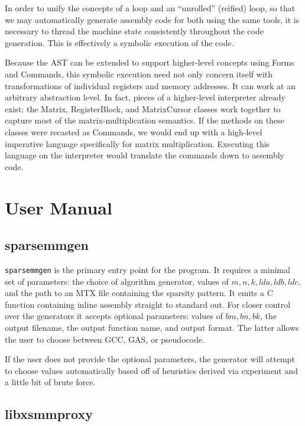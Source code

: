 In order to unify the concepts of a loop and an ``unrolled'' (reified) loop, so that we may automatically generate assembly code for both using the same tools, it is necessary to thread the machine state consistently throughout the code generation. This is effectively a symbolic execution of the code. 

Because the AST can be extended to support higher-level concepts using Forms and Commands, this symbolic execution need not only concern itself with transformations of individual registers and memory addresses. It can work at an arbitrary abstraction level. In fact, pieces of a higher-level interpreter already exist: the Matrix, RegisterBlock, and MatrixCursor classes work together to capture most of the matrix-multiplication semantics. If the methods on these classes were recasted as Commands, we would end up with a high-level imperative language specifically for matrix multiplication. Executing this language on the interpreter would translate the commands down to assembly code. 


\section{User Manual}



\subsection{sparsemmgen}

\texttt{sparsemmgen} is the primary entry point for the program. It requires a minimal set of parameters: the choice of algorithm generator, values of $m, n, k, lda, ldb, ldc,$ and the path to an MTX file containing the sparsity pattern. It emits a C function containing inline assembly straight to standard out. For closer control over the generators it accepts optional parameters: values of $bm, bn, bk$, the output filename, the output function name, and output format. The latter allows the user to choose between GCC, GAS, or pseudocode.

If the user does not provide the optional parameters, the generator will attempt to choose values automatically based off of heuristics derived via experiment and a little bit of brute force. 


\subsection{libxsmmproxy}

